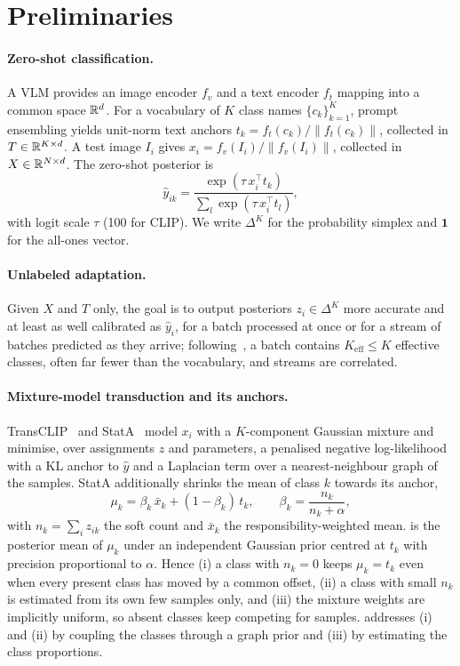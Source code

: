 \section{Preliminaries}
\label{sec:prelim}

\paragraph{Zero-shot classification.}
A VLM provides an image encoder $f_v$ and a text encoder $f_t$ mapping into a common space $\mathbb{R}^d$. For a vocabulary of $K$ class names $\{c_k\}_{k=1}^K$, prompt ensembling yields unit-norm text anchors $t_k = f_t(c_k)/\|f_t(c_k)\|$, collected in $T\in\mathbb{R}^{K\times d}$. A test image $I_i$ gives $x_i = f_v(I_i)/\|f_v(I_i)\|$, collected in $X\in\mathbb{R}^{N\times d}$. The zero-shot posterior is
\begin{equation}
  \hat{y}_{ik} = \frac{\exp(\tau\, x_i^{\top} t_k)}{\sum_{l}\exp(\tau\, x_i^{\top} t_l)},
  \label{eq:zs}
\end{equation}
with logit scale $\tau$ (100 for CLIP). We write $\Delta^K$ for the probability simplex and $\mathbf{1}$ for the all-ones vector.

\paragraph{Unlabeled adaptation.}
Given $X$ and $T$ only, the goal is to output posteriors $z_i\in\Delta^K$ more accurate and at least as well calibrated as $\hat{y}_i$, for a batch processed at once or for a stream of batches predicted as they arrive; following~\cite{zanella2025stata}, a batch contains $K_{\mathrm{eff}}\le K$ effective classes, often far fewer than the vocabulary, and streams are correlated.

\paragraph{Mixture-model transduction and its anchors.}
TransCLIP~\cite{zanella2024transclip} and StatA~\cite{zanella2025stata} model $x_i$ with a $K$-component Gaussian mixture and minimise, over assignments $z$ and parameters, a penalised negative log-likelihood with a KL anchor to $\hat{y}$ and a Laplacian term over a nearest-neighbour graph of the samples. StatA additionally shrinks the mean of class $k$ towards its anchor,
\begin{equation}
  \mu_k = \beta_k\,\bar{x}_k + (1-\beta_k)\,t_k, \qquad \beta_k = \frac{n_k}{n_k+\alpha},
  \label{eq:stata}
\end{equation}
with $n_k = \sum_i z_{ik}$ the soft count and $\bar{x}_k$ the responsibility-weighted mean.  is the posterior mean of $\mu_k$ under an independent Gaussian prior centred at $t_k$ with precision proportional to $\alpha$. Hence (i) a class with $n_k=0$ keeps $\mu_k = t_k$ even when every present class has moved by a common offset, (ii) a class with small $n_k$ is estimated from its own few samples only, and (iii) the mixture weights are implicitly uniform, so absent classes keep competing for samples. \method addresses (i) and (ii) by coupling the classes through a graph prior and (iii) by estimating the class proportions.
